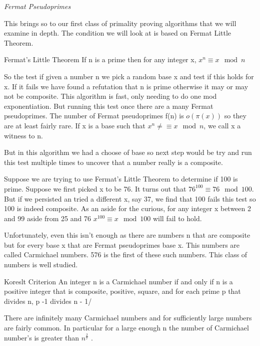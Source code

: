 \documentclass{article}
\begin{document}
\textit{Fermat Pseudoprimes}

This brings so to our first class of primality proving algorithms that we will examine in depth. The condition we will look at is based on Fermat Little Theorem. 
\begin{theorem}{Fermat's Little Theorem}
If n is a prime then for any integer x, $x^n \equiv x \mod n$
\end{theorem}
So the test if given a number n we pick a random base x and test if this holds for x. If it fails we have found a refutation that n is prime otherwise it may or may not be composite. This algorithm is fast, only needing to do one mod exponentiation. But running this test once there are a many Fermat pseudoprimes. The number of Fermat pseudoprimes f(n) is $o(\pi(x))$ so they are at least fairly rare. If x is a base such that $x^n \neq \equiv x \mod n$, we call x a witness to n. 

But in this algorithm we had a choose of base so next step would be try and run this test multiple times to uncover that a number really is a composite. 
\begin{example}
Suppose we are trying to use Fermat's Little Theorem to determine if 100 is prime. Suppose we first picked x to be 76. It turns out that $76^{100} \equiv 76 \mod 100$. But if we persisted an tried a different x, say 37, we find that 100 fails this test so 100 is indeed composite. As an aside for the curious, for any integer x between 2 and 99 aside from 25 and 76 $x^100 \equiv x \mod 100$ will fail to hold. 
\end{example}
Unfortunately, even this isn't enough as there are numbers n that are composite but for every base x that are Fermat pseudoprimes base x. This numbers are called Carmichael numbers. 576 is the first of these such numbers. This class of numbers is well studied. 
\begin{theorem}{Koreslt Criterion}
An integer n is a Carmichael number if and only if n is a positive integer that is composite, positive, square, and for each prime p that divides n, p -1 divides n - 1/
\end{theorem}
There are infinitely many Carmichael numbers and for sufficiently large numbers are fairly common. In particular for a large enough n the number of Carmichael number's is greater than $n^{\frac{2}{7}}$ \cite{alford1994there}.  
\end{document}
